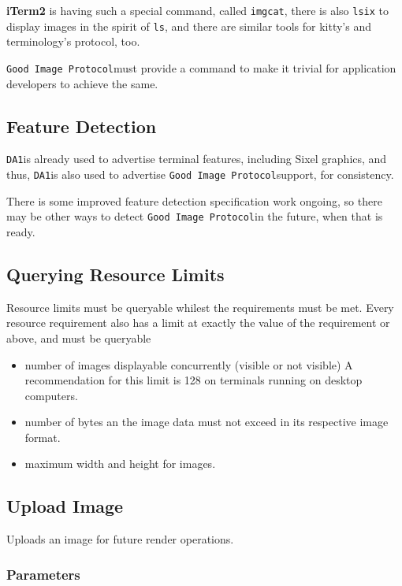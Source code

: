 \documentclass[a4paper]{article}
\newcommand{\code}[1]{\colorbox{light-gray}{\texttt{#1}}}
\newcommand{\DA}{\code{DA1}}
\newcommand{\GoodImageProtocol}{\code{Good Image Protocol}}
\begin{document}
\textbf{iTerm2} is having such a special command, called \code{imgcat},
there is also \code{lsix} to display images in the spirit of \code{ls},
and there are similar tools for kitty's and terminology's protocol, too.

\GoodImageProtocol must provide a command to make it trivial for application
developers to achieve the same.


\subsection{Feature Detection} %

\DA is already used to advertise terminal features, including Sixel graphics, and thus,
\DA is also used to advertise \GoodImageProtocol support, for consistency.

There is some improved feature detection specification work ongoing,
so there may be other ways to detect \GoodImageProtocol in the future, when that is ready.

\subsection{Querying Resource Limits} %

Resource limits must be queryable whilest the requirements must be met.
Every resource requirement also has a limit at exactly
the value of the requirement or above, and must be queryable

\begin{itemize}
    \item number of images displayable concurrently (visible or not visible)
        A recommendation for this limit is 128 on terminals running on desktop computers.
    \item number of bytes an the image data must not exceed in its respective image format.
    \item maximum width and height for images.
\end{itemize}

\subsection{Upload Image} %

Uploads an image for future render operations.

\subsubsection*{Parameters}
\end{document}
